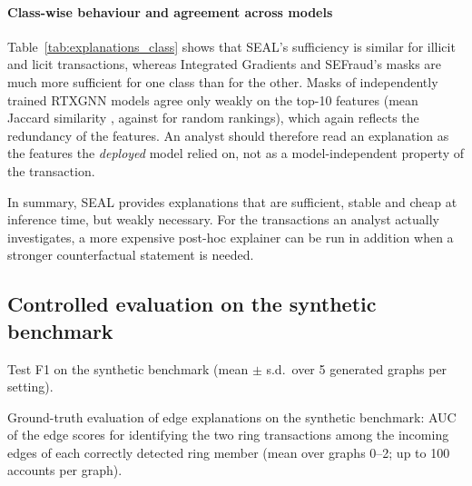 \paragraph{Class-wise behaviour and agreement across models} Table~\ref{tab:explanations_class} shows that SEAL's sufficiency is similar for illicit and licit transactions, whereas Integrated Gradients and SEFraud's masks are much more sufficient for one class than for the other. Masks of independently trained RTXGNN models agree only weakly on the top-10 features (mean Jaccard similarity \crossSeedSeal, against \crossSeedRandom{} for random rankings), which again reflects the redundancy of the features. An analyst should therefore read an explanation as the features the \emph{deployed} model relied on, not as a model-independent property of the transaction.

In summary, SEAL provides explanations that are sufficient, stable and cheap at inference time, but weakly necessary. For the transactions an analyst actually investigates, a more expensive post-hoc explainer can be run in addition when a stronger counterfactual statement is needed.

\subsection{Controlled evaluation on the synthetic benchmark}
\label{subsec:synthetic}

\begin{table}[!t]
\centering
\caption{Test F1 on the synthetic benchmark (mean $\pm$ s.d.\ over 5 generated graphs per setting).}
\label{tab:synthetic}
\footnotesize
\setlength{\tabcolsep}{3pt}
\begin{adjustbox}{max width=\textwidth}\end{adjustbox}
\end{table}

\begin{table}[!t]
\centering
\caption{Ground-truth evaluation of edge explanations on the synthetic benchmark: AUC of the edge scores for identifying the two ring transactions among the incoming edges of each correctly detected ring member (mean over graphs 0--2; up to 100 accounts per graph).}
\label{tab:synthetic_edges}
\footnotesize
\begin{adjustbox}{max width=\textwidth}\end{adjustbox}
\end{table}

